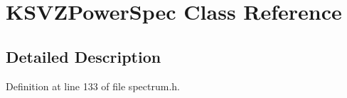 \hypertarget{class_k_s_v_z_power_spec}{}\section{K\+S\+V\+Z\+Power\+Spec Class Reference}
\label{class_k_s_v_z_power_spec}


\subsection{Detailed Description}


Definition at line 133 of file spectrum.\+h.

